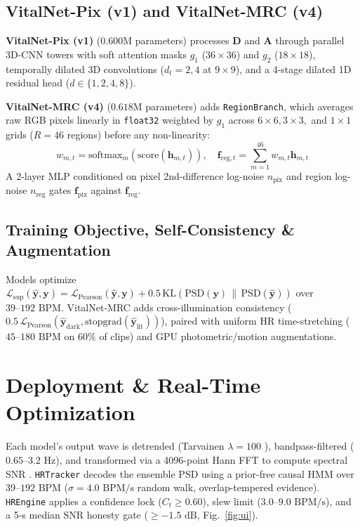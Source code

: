 \documentclass[conference]{IEEEtran}
\begin{document}
\subsection{VitalNet-Pix (v1) and VitalNet-MRC (v4)}
\textbf{VitalNet-Pix (v1)} ($0.600\text{M}$ parameters) processes $\mathbf{D}$ and $\mathbf{A}$ through parallel 3D-CNN towers with soft attention masks $g_1$ ($36\times 36$) and $g_2$ ($18\times 18$), temporally dilated 3D convolutions ($d_t = 2, 4$ at $9\times 9$), and a 4-stage dilated 1D residual head ($d \in \{1, 2, 4, 8\}$).

\textbf{VitalNet-MRC (v4)} ($0.618\text{M}$ parameters) adds \texttt{RegionBranch}, which averages raw RGB pixels linearly in \texttt{float32} weighted by $g_1$ across $6\times 6, 3\times 3,$ and $1\times 1$ grids ($R = 46$ regions) before any non-linearity:
\begin{equation}
    w_{m,t} = \text{softmax}_m(\text{score}(\mathbf{h}_{m,t})), \quad \mathbf{f}_{\text{reg},t} = \sum_{m=1}^{46} w_{m,t} \mathbf{h}_{m,t}
\end{equation}
A 2-layer MLP conditioned on pixel 2nd-difference log-noise $n_{\text{pix}}$ and region log-noise $n_{\text{reg}}$ gates $\mathbf{f}_{\text{pix}}$ against $\mathbf{f}_{\text{reg}}$.

\subsection{Training Objective, Self-Consistency \& Augmentation}
Models optimize $\mathcal{L}_{\text{sup}}(\hat{\mathbf{y}}, \mathbf{y}) = \mathcal{L}_{\text{Pearson}}(\hat{\mathbf{y}}, \mathbf{y}) + 0.5\, \text{KL}(\text{PSD}(\mathbf{y}) \,\|\, \text{PSD}(\hat{\mathbf{y}}))$ over $39\text{--}192\text{ BPM}$. VitalNet-MRC adds cross-illumination consistency ($0.5\, \mathcal{L}_{\text{Pearson}}(\hat{\mathbf{y}}_{\text{dark}}, \text{stopgrad}(\hat{\mathbf{y}}_{\text{lit}}))$), paired with uniform HR time-stretching ($45\text{--}180\text{ BPM}$ on $60\%$ of clips) and GPU photometric/motion augmentations.

\section{Deployment \& Real-Time Optimization}
Each model's output wave is detrended (Tarvainen $\lambda = 100$ \cite{tarvainen2002detrend}), bandpass-filtered ($0.65\text{--}3.2\text{ Hz}$), and transformed via a 4096-point Hann FFT to compute spectral SNR \cite{dehaan2013chrom}. \texttt{HRTracker} decodes the ensemble PSD using a prior-free causal HMM over $39\text{--}192\text{ BPM}$ ($\sigma = 4.0\text{ BPM/s}$ random walk, overlap-tempered evidence). \texttt{HREngine} applies a confidence lock ($C_t \ge 0.60$), slew limit ($3.0\text{--}9.0\text{ BPM/s}$), and a 5-s median SNR honesty gate ($\ge -1.5\text{ dB}$, Fig.~\ref{fig:ui}).
\end{document}
